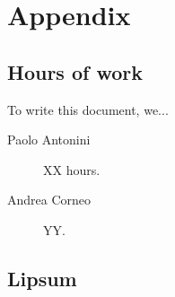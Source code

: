\chapter{Appendix}

\section{Hours of work}
To write this document, we...

\begin{description}
	\item [Paolo Antonini] XX hours.
	\item [Andrea Corneo] YY.
\end{description}

\section{Lipsum}

\lipsum[10]
